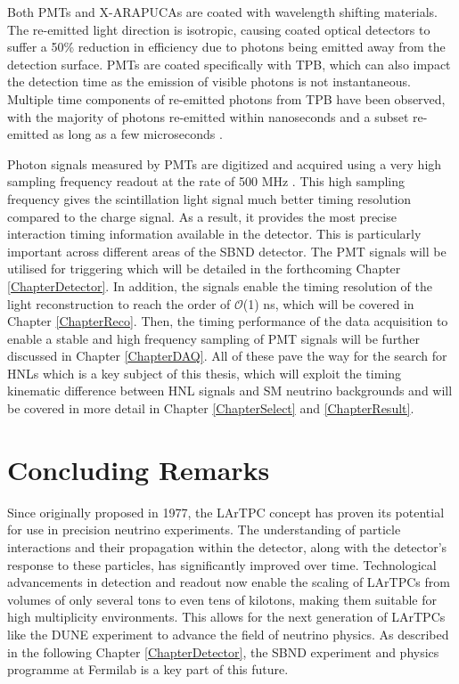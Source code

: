 Both PMTs and X-ARAPUCAs are coated with wavelength shifting materials.
The re-emitted light direction is isotropic, causing coated optical detectors to suffer a 50\% reduction in efficiency due to photons being emitted away from the detection surface.
PMTs are coated specifically with TPB, which can also impact the detection time as the emission of visible photons is not instantaneous.
Multiple time components of re-emitted photons from TPB have been observed, with the majority of photons re-emitted within nanoseconds and a subset re-emitted as long as a few microseconds \cite{tpb_time}.

Photon signals measured by PMTs are digitized and acquired using a very high sampling frequency readout at the rate of 500 MHz \cite{sbnd_det}.
This high sampling frequency gives the scintillation light signal much better timing resolution compared to the charge signal.
As a result, it provides the most precise interaction timing information available in the detector.
This is particularly important across different areas of the SBND detector.
The PMT signals will be utilised for triggering which will be detailed in the forthcoming Chapter \ref{ChapterDetector}.
In addition, the signals enable the timing resolution of the light reconstruction to reach the order of $\mathcal{O}$(1) ns, which will be covered in Chapter \ref{ChapterReco}.
Then, the timing performance of the data acquisition to enable a stable and high frequency sampling of PMT signals will be further discussed in Chapter \ref{ChapterDAQ}.
All of these pave the way for the search for HNLs which is a key subject of this thesis, which will exploit the timing kinematic difference between HNL signals and SM neutrino backgrounds and will be covered in more detail in Chapter \ref{ChapterSelect} and \ref{ChapterResult}.

\section{Concluding Remarks}
\label{lartpcConclude}
Since originally proposed in 1977, the LArTPC concept has proven its potential for use in precision neutrino experiments.
The understanding of particle interactions and their propagation within the detector, along with the detector's response to these particles, has significantly improved over time. 
Technological advancements in detection and readout now enable the scaling of LArTPCs from volumes of only several tons to even tens of kilotons, making them suitable for high multiplicity environments.
This allows for the next generation of LArTPCs like the DUNE experiment to advance the field of neutrino physics.
As described in the following Chapter \ref{ChapterDetector}, the SBND experiment and physics programme at Fermilab is a key part of this future.

